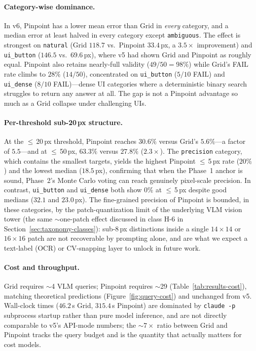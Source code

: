 \documentclass[sigconf,nonacm]{acmart}
\begin{document}
\paragraph{Category-wise dominance.}
In v6, Pinpoint has a lower mean error than Grid in \emph{every}
category, and a median error at least halved in every category except
\texttt{ambiguous}.  The effect is strongest on
\texttt{natural} (Grid $118.7$ vs.\ Pinpoint $33.4$\,px, a $3.5\times$
improvement) and \texttt{ui\_button} ($146.5$ vs.\ $69.6$\,px), where
v5 had shown Grid and Pinpoint as roughly equal.  Pinpoint also
retains nearly-full validity ($49/50 = 98\%$) while Grid's FAIL rate
climbs to $28\%$ ($14/50$), concentrated on
\texttt{ui\_button} ($5/10$ FAIL) and \texttt{ui\_dense} ($8/10$
FAIL)---dense UI categories where a deterministic binary search
struggles to return any answer at all.  The gap is not a Pinpoint
advantage so much as a Grid collapse under challenging UIs.

\paragraph{Per-threshold sub-20\,px structure.}
At the $\leq$\,20\,px threshold, Pinpoint reaches $30.6\%$ versus
Grid's $5.6\%$---a factor of $5.5$---and at $\leq$\,50\,px,
$63.3\%$ versus $27.8\%$ ($2.3\times$).  The \texttt{precision}
category, which contains the smallest targets, yields the highest
Pinpoint $\leq$\,5\,px rate ($20\%$) and the lowest median
($18.5$\,px), confirming that when the Phase~1 anchor is sound,
Phase~2's Monte Carlo voting can reach genuinely pixel-scale
precision.  In contrast, \texttt{ui\_button} and \texttt{ui\_dense}
both show $0\%$ at $\leq$\,5\,px despite good medians ($32.1$ and
$23.0$\,px).  The fine-grained precision of Pinpoint is bounded, in
these categories, by the patch-quantization limit of the underlying
VLM vision tower (the same $\sim$one-patch effect discussed in
class H-6 in Section~\ref{sec:taxonomy-classes}): sub-$8$\,px
distinctions inside a single $14 \times 14$ or $16 \times 16$ patch
are not recoverable by prompting alone, and are what we expect a
text-label (OCR) or CV-snapping layer to unlock in future work.

\paragraph{Cost and throughput.}
Grid requires $\sim$4 VLM queries; Pinpoint requires $\sim$29
(Table~\ref{tab:results-cost}), matching theoretical predictions
(Figure~\ref{fig:query-cost}) and unchanged from v5.  Wall-clock
times ($46.2$\,s Grid, $315.4$\,s Pinpoint) are dominated by
\texttt{claude -p} subprocess startup rather than pure model
inference, and are not directly comparable to v5's API-mode numbers;
the $\sim$$7\times$ ratio between Grid and Pinpoint tracks the query
budget and is the quantity that actually matters for cost models.
\end{document}
